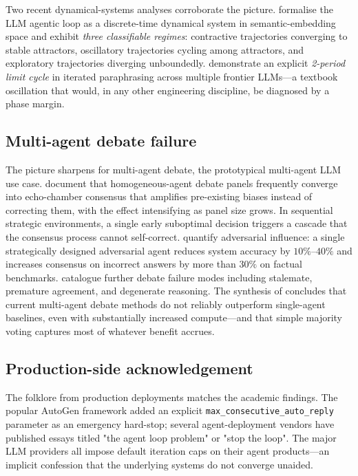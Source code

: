 \documentclass[11pt,a4paper]{article}
\theoremstyle{definition}
\theoremstyle{remark}
\begin{document}
Two recent dynamical-systems analyses corroborate the picture.
\citet{Tacheny2025AgenticLoops} formalise the LLM agentic loop as a
discrete-time dynamical system in semantic-embedding space and exhibit
\emph{three classifiable regimes}: contractive trajectories converging to
stable attractors, oscillatory trajectories cycling among attractors, and
exploratory trajectories diverging unboundedly.
\citet{Wang2025AttractorCycles} demonstrate an explicit \emph{2-period
limit cycle} in iterated paraphrasing across multiple frontier LLMs---a
textbook oscillation that would, in any other engineering discipline, be
diagnosed by a phase margin.

\subsection{Multi-agent debate failure}

The picture sharpens for multi-agent debate, the prototypical
multi-agent LLM use case.
\citet{Oh2025BeliefEntrenchment} document that homogeneous-agent
debate panels frequently converge into echo-chamber consensus that
amplifies pre-existing biases instead of correcting them, with the
effect intensifying as panel size grows.  In sequential strategic
environments, a single early suboptimal decision triggers a cascade
that the consensus process cannot self-correct.
\citet{Sci2026PersuasionFailure} quantify adversarial influence:
a single strategically designed adversarial agent reduces system
accuracy by $10\%$--$40\%$ and increases consensus on incorrect
answers by more than $30\%$ on factual benchmarks.
\citet{Wynn2025TalkCheap} catalogue further debate failure modes
including stalemate, premature agreement, and degenerate reasoning.
The synthesis of \citet{ICLRBlog2025MAD} concludes that current
multi-agent debate methods do not reliably outperform single-agent
baselines, even with substantially increased compute---and that simple
majority voting captures most of whatever benefit accrues.

\subsection{Production-side acknowledgement}

The folklore from production deployments matches the academic findings.
The popular AutoGen framework added an explicit
\texttt{max\_consecutive\_auto\_reply} parameter as an emergency hard-stop;
several agent-deployment vendors have published essays titled "the agent
loop problem" or "stop the loop".  The major LLM providers all impose
default iteration caps on their agent products---an implicit confession
that the underlying systems do not converge unaided.
\end{document}
